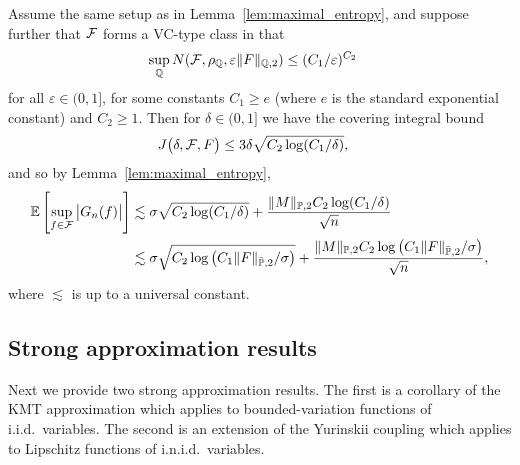 \begin{lemma}
  \label{lem:maximal_vc_inid}

  Assume the same setup as in
  Lemma~\ref{lem:maximal_entropy},
  and suppose further that $\mathcal{F}$ forms a VC-type class
  in that
  \begin{align*}
    \sup_{\mathbb{Q}} N(\mathcal{F}, \rho_{\mathbb{Q}}, \varepsilon \|F\|_{\mathbb{Q},2})
    &\leq
    (C_1/\varepsilon)^{C_2}
  \end{align*}
  for all $\varepsilon \in (0,1]$,
  for some constants
  $C_1 \geq e$
  (where $e$ is the standard exponential constant)
  and $C_2 \geq 1$.
  Then for $\delta \in (0,1]$
  we have the covering integral bound
  \begin{align*}
    J\big(\delta, \mathcal{F}, F\big)
    &\leq
    3 \delta
    \sqrt{C_2 \log (C_1/\delta)},
  \end{align*}
  and so by Lemma~\ref{lem:maximal_entropy},
  \begin{align*}
    \mathbb{E} \left[
      \sup_{f \in \mathcal{F}}
      \big| G_n(f) \big|
    \right]
    &\lesssim
    \sigma
    \sqrt{C_2 \log (C_1/\delta)}
    +
    \frac{\|M\|_{\mathbb{P},2} C_2 \log(C_1/\delta)}{\sqrt{n}} \\
    &\lesssim
    \sigma
    \sqrt{C_2 \log \big(C_1 \|F\|_{\bar{\mathbb{P}},2}/\sigma\big)}
    +
    \frac{\|M\|_{\mathbb{P},2} C_2 \log \big(C_1 \|F\|_{\bar{\mathbb{P}},2}/\sigma\big)}
    {\sqrt{n}},
  \end{align*}
  where $\lesssim$ is up to a universal constant.

\end{lemma}

\subsection{Strong approximation results}

Next we provide two strong approximation results.
The first is a corollary of the KMT approximation
\citep{komlos1975approximation}
which applies to bounded-variation functions
of i.i.d.\ variables.
The second is an extension of the Yurinskii coupling
\citep{belloni2019conditional}
which applies to Lipschitz functions
of i.n.i.d.\ variables.

